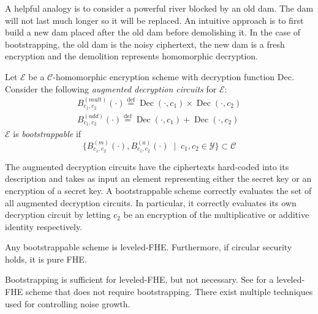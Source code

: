 A helpful analogy is to consider a powerful river blocked by an old dam. The dam will not last much longer so it will be replaced. An intuitive approach is to first build a new dam placed after the old dam before demolishing it. In the case of bootstrapping, the old dam is the noisy ciphertext, the new dam is a fresh encryption and the demolition represents homomorphic decryption.

\begin{definition}
    Let $\mathcal{E}$ be a $\mathcal{C}$-homomorphic encryption scheme with decryption function Dec. Consider the following \textit{augmented decryption circuits} for $\mathcal{E}$:
    \begin{equation*}
    \begin{aligned}        
        B_{c_1,c_2}^{(mult)}(\cdot) \stackrel{\mathrm{def}}{=} \operatorname{Dec}(\cdot, c_1) \times \operatorname{Dec}(\cdot, c_2)\\
        B_{c_1,c_2}^{(add)}(\cdot) \stackrel{\mathrm{def}}{=} \operatorname{Dec}(\cdot, c_1) + \operatorname{Dec}(\cdot, c_2)
    \end{aligned}
    \end{equation*}
    $\mathcal{E}$ is \textit{bootstrappable} if
    \begin{equation*}
    \{B_{c_1,c_2}^{(m)}(\cdot), B_{c_1,c_2}^{(a)}(\cdot) \; \mid \; c_1, c_2 \in \mathcal{Y}\} \subset \mathcal{C}
    \end{equation*}
\end{definition}

The augmented decryption circuits have the ciphertexts hard-coded into its description and takes as input an element representing either the secret key or an encryption of a secret key. A bootstrappable scheme correctly evaluates the set of all augmented decryption circuits. In particular, it correctly evaluates its own decryption circuit by letting $c_2$ be an encryption of the multiplicative or additive identity respectively.

\begin{theorem}
Any bootstrappable scheme is leveled-FHE. Furthermore, if circular security holds, it is pure FHE.
\end{theorem}
\begin{remark}
    Bootstrapping is sufficient for leveled-FHE, but not necessary. See \cite{BGV12-no-bootstrap} for a leveled-FHE scheme that does not require bootstrapping. There exist multiple techniques used for controlling noise growth.
\end{remark}

